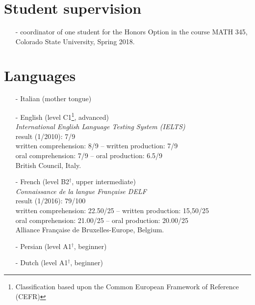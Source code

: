 \documentclass[margin]{res}
\begin{document}
\begin{resume}
  
  \section{Student supervision}
  \begin{itemize} \itemsep -2pt  %
 \item[-] coordinator of one student for the Honors Option in the course MATH 345, Colorado State University, Spring 2018.\\
 \end{itemize}





\section{Languages}
\begin{itemize}
\item[-] Italian (mother tongue) \\
\item[-] English (level C1\footnote{Classification based upon the Common European Framework of Reference (CEFR)}, advanced) \vspace{2mm}   \\ 
 \emph{International English Language Testing System (IELTS)} \\
result (1/2010): 7/9 \\
written comprehension: 8/9 -- written production: 7/9\\
oral comprehension: 7/9 -- oral production: 6.5/9\\ 
British Council, Italy. \\
\item[-] French (level B2$^\dagger$, upper intermediate) \vspace{2mm}   \\ 
 \emph{Connaissance de la langue Fran\c{c}aise DELF} \\
 result (1/2016): 79/100 \\
written comprehension: 22.50/25 -- written production: 15,50/25\\
oral comprehension: 21.00/25 --  oral production: 20.00/25\\ 
Alliance Fran\c{c}aise de Bruxelles-Europe, Belgium.   \\
\item[-] Persian (level A1$^\dagger$, beginner)\\
\item[-] Dutch (level A1$^\dagger$, beginner)
\end{itemize}





\end{resume}
\end{document}
